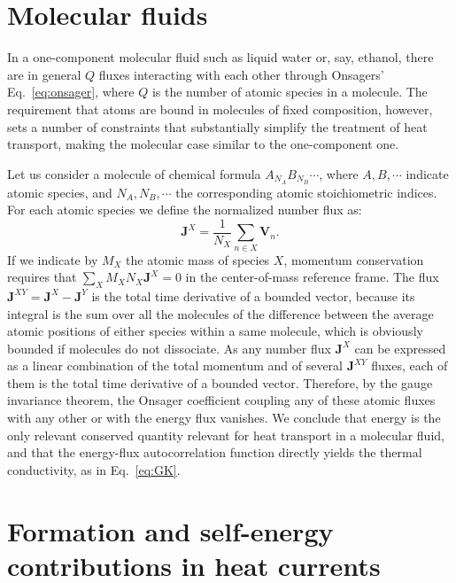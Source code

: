 \section{Molecular fluids}  \label{sec:MolecularFluids}
In a one-component molecular fluid such as liquid water or, say, ethanol, there are in general $Q$ fluxes interacting with each other through Onsagers' Eq.~\eqref{eq:onsager}, where $Q$ is the number of atomic species in a molecule. The requirement that atoms are bound in molecules of fixed composition, however, sets a number of constraints that substantially simplify the treatment of heat transport, making the molecular case similar to the one-component one.

Let us consider a molecule of chemical formula $A_{N_A} B_{N_B}\cdots$, where $A, B,\cdots$ indicate atomic species, and $N_A,N_B,\cdots$ the corresponding atomic stoichiometric indices. For each atomic species we define the normalized number flux as:
\begin{equation}
  \mathbf{J}^X = \frac{1}{N_X}\sum_{n\in X} \mathbf{V}_n. \label{eq:JX}
\end{equation}
If we indicate by $M_X$ the atomic mass of species $X$, momentum conservation requires that $\sum_X M_X N_X \mathbf{J}^X = 0$ in the center-of-mass reference frame. The flux $\mathbf{J}^{XY} = \mathbf{J}^{X}-\mathbf{J}^{Y}$ is the total time derivative of a bounded vector, because its integral is the sum over all the molecules of the difference between the average atomic positions of either species within a same molecule, which is obviously bounded if molecules do not dissociate. As any number flux $\mathbf{J}^X$ can be expressed as a linear combination of the total momentum and of several $\mathbf{J}^{XY}$ fluxes, each of them is the total time derivative of a bounded vector. Therefore, by the gauge invariance theorem, the Onsager coefficient coupling any of these atomic fluxes with any other or with the energy flux vanishes. We conclude that energy is the only relevant conserved quantity relevant for heat transport in a molecular fluid, and that the energy-flux autocorrelation function directly yields the thermal conductivity, as in Eq.~\eqref{eq:GK}.


\section{Formation and self-energy contributions in heat currents}  \label{sec:gauge-renormalization}


